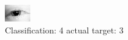 \begin{figure}[h!]
\begin{center}
\includegraphics[width=0.60\columnwidth]{figures/ID27_class_4_target_3.png}
\end{center}
\caption{ Classification: 4 actual target: 3}
\label{fig:ID27_class_4_target_3}
\end{figure}
